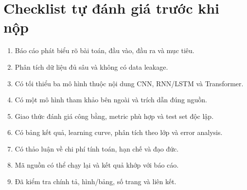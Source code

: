 \documentclass[12pt,a4paper,oneside]{report}
\newcommand{\checkitem}{\item[$\square$]}
\begin{document}
\chapter{Checklist tự đánh giá trước khi nộp}
\begin{enumerate}[leftmargin=*]
  \checkitem Báo cáo phát biểu rõ bài toán, đầu vào, đầu ra và mục tiêu.
  \checkitem Phân tích dữ liệu đủ sâu và không có data leakage.
  \checkitem Có tối thiểu ba mô hình thuộc nội dung CNN, RNN/LSTM và Transformer.
  \checkitem Có một mô hình tham khảo bên ngoài và trích dẫn đúng nguồn.
  \checkitem Giao thức đánh giá công bằng, metric phù hợp và test set độc lập.
  \checkitem Có bảng kết quả, learning curve, phân tích theo lớp và error analysis.
  \checkitem Có thảo luận về chi phí tính toán, hạn chế và đạo đức.
  \checkitem Mã nguồn có thể chạy lại và kết quả khớp với báo cáo.

  \checkitem Đã kiểm tra chính tả, hình/bảng, số trang và liên kết.
\end{enumerate}
\end{document}
